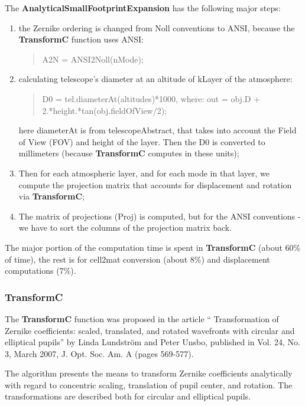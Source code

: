 \documentclass[a4paper,11pt]{book}
\begin{document}
The \textbf{AnalyticalSmallFootprintExpansion} has the following major steps:
\begin{enumerate}

 \item the Zernike ordering is changed from Noll conventions to ANSI, because the \textbf{TransformC} function uses ANSI:

\begin{quotation}
	A2N   =  ANSI2Noll(nMode); %
\end{quotation} 

 \item calculating telescope's diameter at an altitude of kLayer of the atmosphere:
\begin{quotation}
	D0 = tel.diameterAt(altitudes)*1000,  where:  out = obj.D + 2.*height.*tan(obj.fieldOfView/2);
\end{quotation}
here diameterAt is from telescopeAbstract, that takes into account the Field of View (FOV) and height of the layer. Then the D0 is converted to millimeters (because \textbf{TransformC} computes in these units);

\item Then for each atmospheric layer, and for each mode in that layer, we compute the projection matrix that accounts for displacement and rotation via \textbf{TransformC};

\item The matrix of projections (Proj) is computed, but for the ANSI conventions - we have to sort the columns of the projection matrix back.
\end{enumerate}

The major portion of the computation time is spent in \textbf{TransformC} (about 60\% of time), the rest is for cell2mat conversion (about 8\%)  and displacement computations (7\%).




\subsubsection{TransformC}
The \textbf{TransformC} function was proposed in the article `` Transformation of Zernike coefficients: scaled, translated, and rotated wavefronts with circular and elliptical pupils'' by Linda Lundstr\"{o}m and Peter Unsbo, published in Vol. 24, No. 3, March 2007,  J. Opt. Soc. Am. A (pages 569-577).

The algorithm presents the means to transform Zernike coefficients analytically with regard to concentric scaling, translation of pupil center, and rotation. The transformations are described both for circular and elliptical pupils. 
\end{document}
